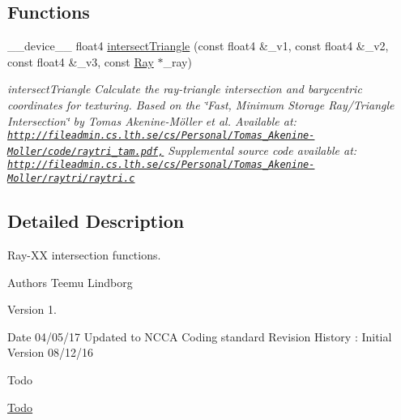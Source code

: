 \subsection*{Functions}
\begin{DoxyCompactItemize}
\item 
\-\_\-\-\_\-device\-\_\-\-\_\- float4 \hyperlink{RayIntersection_8cuh_a86a2a10b030839e95d2fb1463aba4d4a}{intersect\-Triangle} (const float4 \&\-\_\-v1, const float4 \&\-\_\-v2, const float4 \&\-\_\-v3, const \hyperlink{structRay}{Ray} $\ast$\-\_\-ray)
\begin{DoxyCompactList}\small\item\em intersect\-Triangle Calculate the ray-\/triangle intersection and barycentric coordinates for texturing. Based on the \char`\"{}\-Fast, Minimum Storage Ray/\-Triangle Intersection\char`\"{} by Tomas Akenine-\/\-Möller et al. Available at\-: \href{http://fileadmin.cs.lth.se/cs/Personal/Tomas_Akenine-Moller/code/raytri_tam.pdf,}{\tt http\-://fileadmin.\-cs.\-lth.\-se/cs/\-Personal/\-Tomas\-\_\-\-Akenine-\/\-Moller/code/raytri\-\_\-tam.\-pdf,} Supplemental source code available at\-: \href{http://fileadmin.cs.lth.se/cs/Personal/Tomas_Akenine-Moller/raytri/raytri.c}{\tt http\-://fileadmin.\-cs.\-lth.\-se/cs/\-Personal/\-Tomas\-\_\-\-Akenine-\/\-Moller/raytri/raytri.\-c} \end{DoxyCompactList}\end{DoxyCompactItemize}


\subsection{Detailed Description}
Ray-\/\-X\-X intersection functions. \begin{DoxyAuthor}{Authors}
Teemu Lindborg 
\end{DoxyAuthor}
\begin{DoxyVersion}{Version}
1. 
\end{DoxyVersion}
\begin{DoxyDate}{Date}
04/05/17 Updated to N\-C\-C\-A Coding standard Revision History \-: Initial Version 08/12/16 
\end{DoxyDate}
\begin{DoxyRefDesc}{Todo}
\item[\hyperlink{todo__todo000004}{Todo}]
\begin{DoxyItemize}
\item 
\end{DoxyItemize}\end{DoxyRefDesc}


